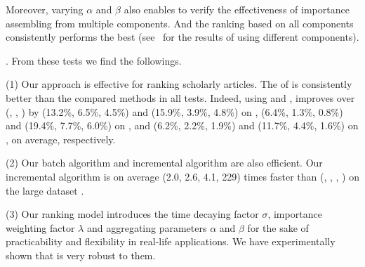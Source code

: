 Moreover, varying $\alpha$ and $\beta$ also enables to verify the effectiveness of importance assembling from multiple components.
And the ranking based on all components consistently performs the best (see~\cite{SARank-full} for the results of using different components).



.
From these tests we find the followings.


\noindent(1) Our approach \ensemblerank is effective for ranking scholarly articles. %
The \PairAcc of \ensemblerank is consistently better than the compared methods in all tests. Indeed, using \recom and \fcita, \ensemblerank improves \PairAcc over (\pagerank, \futurerank, \hhgrank) by
(13.2\%, 6.5\%, 4.5\%) and (15.9\%, 3.9\%, 4.8\%) on \aan,
(6.4\%, 1.3\%, 0.8\%) and (19.4\%, 7.7\%, 6.0\%) on \aminer, and
(6.2\%, 2.2\%, 1.9\%) and (11.7\%, 4.4\%, 1.6\%) on \magdata, on average, respectively.


\noindent(2) Our batch algorithm \batensemble and incremental algorithm \incensemble are also efficient.
%
Our incremental algorithm \incensemble is on average (2.0, 2.6, 4.1, 229) times faster than (\batensemble, \powensemble, \futurerank, \hhgrank)  on the large dataset \magdata.




\noindent(3) Our ranking model \ensemblerank introduces the time decaying factor $\sigma$, importance weighting factor $\lambda$ and aggregating parameters $\alpha$ and $\beta$ for the sake of practicability and flexibility in real-life applications. We have experimentally shown that \ensemblerank is very robust to them.


